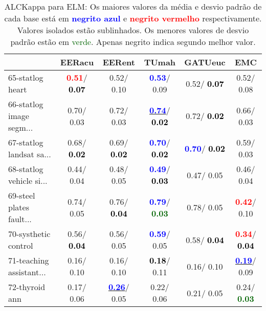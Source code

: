\begin{table}[h]
\caption{ALCKappa para ELM: Os maiores valores da média e desvio padrão de cada base está em \textcolor{blue}{\textbf{negrito azul}} e \textcolor{red}{\textbf{negrito vermelho}} respectivamente. Valores isolados estão sublinhados. Os menores valores de desvio padrão estão em \textcolor{darkgreen}{verde}. Apenas negrito indica segundo melhor valor.}
\begin{center}\begin{tabular}{lc|c|c|c|c}
 & EERacu & EERent & TUmah & \textbf{GATUeuc} & EMC\\ \hline 65-statlog heart & \textcolor{red}{\textbf{  0.51}}/\textcolor{black}{\textbf{  0.07}} &   0.52/  0.10 & \textcolor{blue}{\textbf{  0.53}}/  0.09 &   0.52/\textcolor{black}{\textbf{  0.07}} &   0.52/  0.08 \\
66-statlog image segm... &   0.70/  0.03 &   0.72/  0.03 & \underline{\textcolor{blue}{\textbf{  0.74}}}/\textcolor{black}{\textbf{  0.02}} &   0.72/\textcolor{black}{\textbf{  0.02}} &   0.66/  0.03 \\
67-statlog landsat sa... &   0.68/\textcolor{black}{\textbf{  0.02}} &   0.69/\textcolor{black}{\textbf{  0.02}} & \textcolor{blue}{\textbf{  0.70}}/\textcolor{black}{\textbf{  0.02}} & \textcolor{blue}{\textbf{  0.70}}/\textcolor{black}{\textbf{  0.02}} &   0.59/  0.03 \\
68-statlog vehicle si... &   0.44/  0.04 &   0.48/  0.05 & \textcolor{blue}{\textbf{  0.49}}/\textcolor{black}{\textbf{  0.03}} &   0.47/  0.05 &   0.46/  0.04 \\
69-steel plates fault... &   0.74/  0.05 &   0.76/\textcolor{black}{\textbf{  0.04}} & \textcolor{blue}{\textbf{  0.79}}/\textcolor{darkgreen}{\textbf{  0.03}} &   0.78/  0.05 & \textcolor{red}{\textbf{  0.42}}/  0.10 \\
70-systhetic control &   0.56/\textcolor{black}{\textbf{  0.04}} &   0.56/  0.05 & \textcolor{blue}{\textbf{  0.59}}/  0.05 &   0.58/\textcolor{black}{\textbf{  0.04}} & \textcolor{red}{\textbf{  0.34}}/\textcolor{black}{\textbf{  0.04}} \\
71-teaching assistant... &   0.16/  0.10 &   0.16/  0.10 & \textcolor{black}{\textbf{  0.18}}/  0.11 &   0.16/  0.10 & \underline{\textcolor{blue}{\textbf{  0.19}}}/  0.09 \\ \hline
72-thyroid ann &   0.17/  0.06 & \underline{\textcolor{blue}{\textbf{  0.26}}}/  0.05 &   0.22/  0.06 &   0.21/  0.05 &   0.24/\textcolor{darkgreen}{\textbf{  0.03}} \\

\end{tabular}
\end{center}
\end{table}

